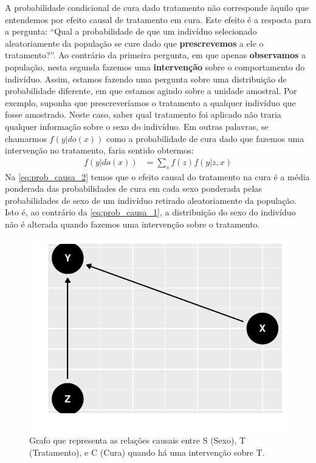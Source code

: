 A probabilidade condicional de cura dado tratamento
não corresponde àquilo que entendemos por
efeito causal de tratamento em cura. 
Este efeito é a resposta para a pergunta:
``Qual a probabilidade de que um indivíduo selecionado
  aleatoriamente da população se cure dado que
  \textbf{prescrevemos} a ele o tratamento?''.
Ao contrário da primeira pergunta,
em que apenas \textbf{observamos} a população,
nesta segunda fazemos uma \textbf{intervenção} sobre
o comportamento do indivíduo.
Assim, estamos fazendo uma pergunta sobre 
uma distribuição de probabilidade diferente,
em que estamos agindo sobre a unidade amostral.
Por exemplo, suponha que prescreveríamos o tratamento
a qualquer indivíduo que fosse amostrado.
Neste caso, saber qual tratamento foi aplicado 
não traria qualquer informação sobre o sexo do indivíduo.
Em outras palavras, se chamarmos $f(y|do(x))$ como
a probabilidade de cura dado que fazemos uma intervenção no tratamento,
faria sentido obtermos:
\begin{align}
 \label{eq:prob_causa_2}
 f(y|do(x)) 
 &= \sum_s f(z)f(y|z,x)
\end{align}
Na \cref{eq:prob_causa_2} temos que o efeito causal 
do tratamento na cura é a média ponderada
das probabilidades de cura em cada sexo ponderada
pelas probabilidades de sexo 
de um indivíduo retirado aleatoriamente da população.
Isto é, ao contrário da \cref{eq:prob_causa_1},
a distribuição do sexo do indivíduo não é alterada quando
fazemos uma intervenção sobre o tratamento.

\begin{knitrout}
\color{fgcolor}\begin{figure}

{\centering \includegraphics[width=\maxwidth]{./figures/simpson_sexo_inter-1} 

}

\caption[Grafo que representa as relações causais entre S (Sexo), T (Tratamento), e C (Cura) quando há uma intervenção sobre T]{Grafo que representa as relações causais entre S (Sexo), T (Tratamento), e C (Cura) quando há uma intervenção sobre T.}\label{fig:simpson_sexo_inter}
\end{figure}

\end{knitrout}


